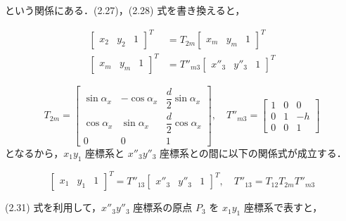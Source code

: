     という関係にある．(2.27)，(2.28) 式を書き換えると，

    \begin{align}
        \begin{bmatrix}
        x_2 & y_2 & 1
        \end{bmatrix}^T
        &= T_{2m}
        \begin{bmatrix}
        x_m & y_m & 1
        \end{bmatrix}^T
        \tag{2.29}
        \\
        \begin{bmatrix}
        x_m & y_m & 1
        \end{bmatrix}^T
        &= T''_{m3}
        \begin{bmatrix}
        x''_3 & y''_3 & 1
        \end{bmatrix}^T
        \tag{2.30}
        \end{align}
        
        \[
        T_{2m} =
        \begin{bmatrix}
        \sin\alpha_x & -\cos\alpha_x & \dfrac{d}{2}\sin\alpha_x \\
        \cos\alpha_x & \sin\alpha_x & \dfrac{d}{2}\cos\alpha_x \\
        0 & 0 & 1
        \end{bmatrix}
        ,\quad
        T''_{m3} =
        \begin{bmatrix}
        1 & 0 & 0 \\
        0 & 1 & -h \\
        0 & 0 & 1
        \end{bmatrix}
        \]
        となるから，$x_1 y_1$ 座標系と $x''_3 y''_3$ 座標系との間に以下の関係式が成立する．

        \[
        \begin{bmatrix}
        x_1 & y_1 & 1
        \end{bmatrix}^T
        =
        T''_{13}
        \begin{bmatrix}
        x''_3 & y''_3 & 1
        \end{bmatrix}^T
        ,\quad
        T''_{13} = T_{12} T_{2m} T''_{m3}
        \tag{2.31}
        \]
        
        (2.31) 式を利用して，$x''_3 y''_3$ 座標系の原点 $P_3$ を $x_1 y_1$ 座標系で表すと，
        
